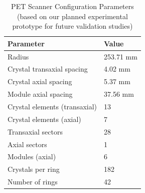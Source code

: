 \documentclass[aps,prb,preprint,groupedaddress,showkeys]{revtex4}
\begin{document}
\begin{table}[htbp]
    \centering
    \caption{PET Scanner Configuration Parameters (based on our planned experimental prototype for future validation studies)}
    \label{tab:detector_params}
    \begin{tabular}{l l}
    \hline \hline \addlinespace[2pt]
    \textbf{Parameter} & \textbf{Value} \\
    \hline\addlinespace[2pt]
    Radius & 253.71 mm \\
    Crystal transaxial spacing & 4.02 mm \\
    Crystal axial spacing & 5.37 mm \\
    Module axial spacing & 37.56 mm \\
    Crystal elements (transaxial) & 13 \\
    Crystal elements (axial) & 7 \\
    Transaxial sectors & 28 \\
    Axial sectors & 1 \\
    Modules (axial) & 6 \\
    Crystals per ring & 182 \\
    Number of rings & 42 \\
    \hline \hline
    \end{tabular}
\end{table}


\end{document}
